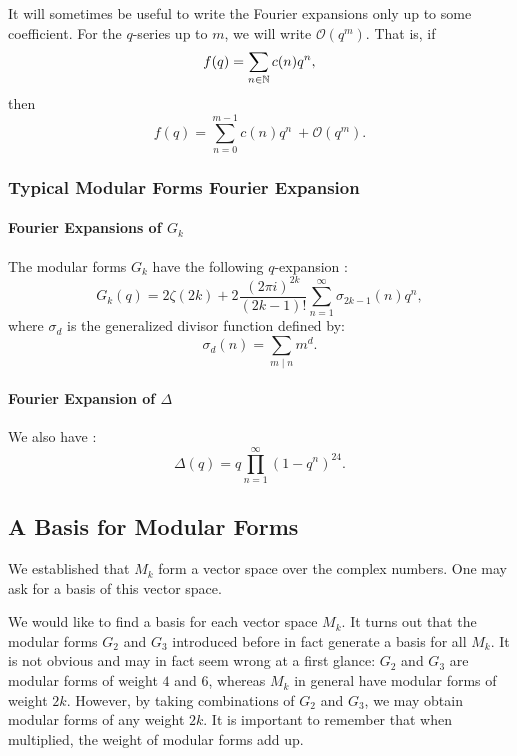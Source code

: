 It will sometimes be useful to write the Fourier expansions only up to some coefficient.
For the $q$-series up to $m$, we will write $\mathcal{O}(q^m)$.
That is, if
$$
f(q) = \sum_{n \in \mathbb{N}} c(n) q^n,
$$
then
$$
f(q) = \sum_{n = 0}^{m-1} c(n) q^n \ + \mathcal{O}(q^m).
$$


\subsubsection{Typical Modular Forms Fourier Expansion}
\paragraph{Fourier Expansions of $G_k$}
The modular forms $G_k$ have the following $q$-expansion \cite[p.92]{CourseInArithmetic}:
$$
G_k(q) = 2\zeta(2k) + 2 \frac{{(2 \pi i)}^{2k}}{(2k-1)!} \sum_{n=1}^{\infty} \sigma_{2k-1}(n)q^n,
$$
where $\sigma_d$ is the generalized divisor function defined by:
$$
\sigma_d(n) = \sum_{m \mid n} m^d.
$$

\paragraph{Fourier Expansion of $\Delta$}
We also have \cite[p.95]{CourseInArithmetic}:
$$
\Delta(q) = q \prod_{n=1}^{\infty} (1-q^n)^{24}.
$$



\subsection{A Basis for Modular Forms}
\label{BasisModularForms}
We established that $M_k$ form a vector space over the complex numbers. 
One may ask for a basis of this vector space.

We would like to find a basis for each vector space $M_k$. It turns out that the modular forms $G_2$ and $G_3$ introduced before in fact generate a basis for all $M_k$. 
It is not obvious and may in fact seem wrong at a first glance: $G_2$ and $G_3$ are modular forms of weight $4$ and $6$, whereas $M_k$ in general have modular forms of weight $2k$.
However, by taking combinations of $G_2$ and $G_3$, we may obtain modular forms of any weight $2k$. It is important to remember that when multiplied, the weight of modular forms add up.

